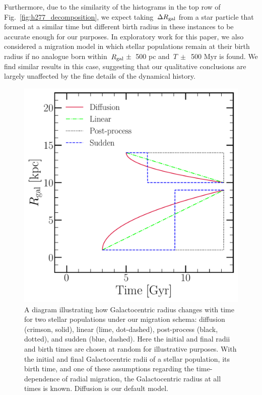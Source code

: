 \documentclass[draft2.tex]{subfiles}
\begin{document}
Furthermore, due to the similarity of the histograms in the top row of 
Fig.~\ref{fig:h277_decomposition}, we expect taking~$\Delta R_\text{gal}$ from 
a star particle that formed at a similar time but different birth radius in 
these instances to be accurate enough for our purposes. 
{\color{red}
In exploratory work for this paper, we also considered a migration model in 
which stellar populations remain at their birth radius if no analogue born 
within~$R_\text{gal}~\pm$~500 pc and~$T~\pm$~500 Myr is found. 
We find similar results in this case, suggesting that our qualitative 
conclusions are largely unaffected by the fine details of the dynamical 
history. 
}

\begin{figure} 
\centering 
\includegraphics[scale = 0.45]{migration.pdf} 
\caption{A diagram illustrating how Galactocentric radius changes with time for 
two stellar populations under our migration schema: diffusion (crimson, solid), 
linear (lime, dot-dashed), post-process (black, dotted), and sudden (blue, 
dashed). Here the initial and final radii and birth times are chosen at random 
for illustrative purposes. With the initial and final Galactocentric radii of 
a stellar population, its birth time, and one of these assumptions regarding 
the time-dependence of radial migration, the Galactocentric radius at all times 
is known. Diffusion is our default model. } 
\label{fig:migration_schema} 
\end{figure} 
\end{document}
